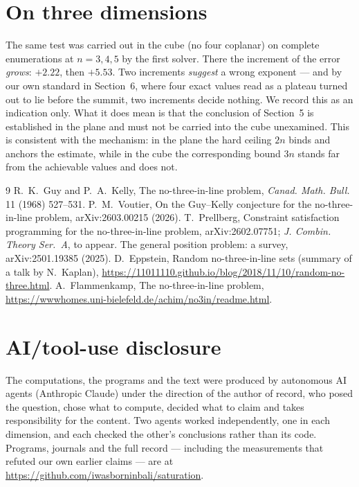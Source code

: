 \documentclass[11pt,a4paper]{article}
\begin{document}
\section{On three dimensions}
The same test was carried out in the cube (no four coplanar) on complete enumerations at
$n=3,4,5$ by the first solver.  There the increment of the error \emph{grows}: $+2.22$, then
$+5.53$.  Two increments \emph{suggest} a wrong exponent --- and by our own standard in
Section~6, where four exact values read as a plateau turned out to lie before the summit, two
increments decide nothing.  We record this as an indication only.  What it does mean is that the
conclusion of Section~5 is established in the plane and must not be carried into the cube
unexamined.  This is consistent with the
mechanism: in the plane the hard ceiling $2n$ binds and anchors the estimate, while in the cube the
corresponding bound $3n$ stands far from the achievable values and does not.

\begin{thebibliography}{9}
 R.~K.~Guy and P.~A.~Kelly, The no-three-in-line problem, \emph{Canad. Math. Bull.} 11 (1968) 527--531.
 P.~M.~Voutier, On the Guy--Kelly conjecture for the no-three-in-line problem, arXiv:2603.00215 (2026).
 T.~Prellberg, Constraint satisfaction programming for the no-three-in-line problem, arXiv:2602.07751; \emph{J. Combin. Theory Ser.~A}, to appear.
 The general position problem: a survey, arXiv:2501.19385 (2025).
 D.~Eppstein, Random no-three-in-line sets (summary of a talk by N.~Kaplan), \url{https://11011110.github.io/blog/2018/11/10/random-no-three.html}.
 A.~Flammenkamp, The no-three-in-line problem, \url{https://wwwhomes.uni-bielefeld.de/achim/no3in/readme.html}.
\end{thebibliography}

\section*{AI/tool-use disclosure}
The computations, the programs and the text were produced by autonomous AI agents (Anthropic Claude)
under the direction of the author of record, who posed the question, chose what to compute, decided
what to claim and takes responsibility for the content.  Two agents worked independently, one in
each dimension, and each checked the other's conclusions rather than its code.  Programs, journals
and the full record --- including the measurements that refuted our own earlier claims --- are at
\url{https://github.com/iwasborninbali/saturation}.
\end{document}
